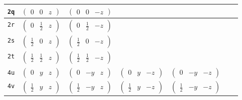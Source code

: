 \documentclass[fleqn,9pt,landscape]{jsarticle}
\begin{document}
\begin{center}
\begin{longtable}{ccccccc}
{\tt 2q} & $ \begin{pmatrix} 0 & 0 & z \end{pmatrix} $ & $ \begin{pmatrix} 0 & 0 & - z \end{pmatrix} $ & $  $ & $  $ & $  $ & $  $ \\ \hline
{\tt 2r} & $ \begin{pmatrix} 0 & \frac{1}{2} & z \end{pmatrix} $ & $ \begin{pmatrix} 0 & \frac{1}{2} & - z \end{pmatrix} $ & $  $ & $  $ & $  $ & $  $ \\ \hline
{\tt 2s} & $ \begin{pmatrix} \frac{1}{2} & 0 & z \end{pmatrix} $ & $ \begin{pmatrix} \frac{1}{2} & 0 & - z \end{pmatrix} $ & $  $ & $  $ & $  $ & $  $ \\ \hline
{\tt 2t} & $ \begin{pmatrix} \frac{1}{2} & \frac{1}{2} & z \end{pmatrix} $ & $ \begin{pmatrix} \frac{1}{2} & \frac{1}{2} & - z \end{pmatrix} $ & $  $ & $  $ & $  $ & $  $ \\ \hline
{\tt 4u} & $ \begin{pmatrix} 0 & y & z \end{pmatrix} $ & $ \begin{pmatrix} 0 & - y & z \end{pmatrix} $ & $ \begin{pmatrix} 0 & y & - z \end{pmatrix} $ & $ \begin{pmatrix} 0 & - y & - z \end{pmatrix} $ & $  $ & $  $ \\ \hline
{\tt 4v} & $ \begin{pmatrix} \frac{1}{2} & y & z \end{pmatrix} $ & $ \begin{pmatrix} \frac{1}{2} & - y & z \end{pmatrix} $ & $ \begin{pmatrix} \frac{1}{2} & y & - z \end{pmatrix} $ & $ \begin{pmatrix} \frac{1}{2} & - y & - z \end{pmatrix} $ & $  $ & $  $ \\ \hline

\end{longtable}
\end{center}
\end{document}
